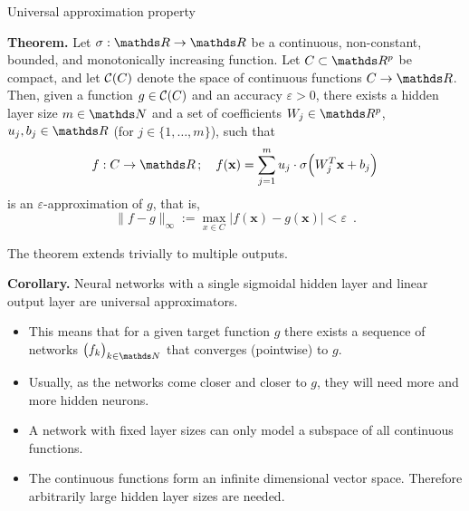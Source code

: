 \begin{vbframe}{Universal approximation property}

  \textbf{Theorem.}
  Let $\sigma : \R \to \R$ be a continuous, non-constant, bounded, and
  monotonically increasing function. Let $C \subset \R^p$ be compact,
  and let $\mathcal{C}(C)$ denote the space of continuous functions $C \to \R$.
  Then, given a function $g \in \mathcal{C}(C)$ and an accuracy $\varepsilon > 0$,
  there exists a hidden layer size $m \in \N$ and a set of coefficients
  $W_j \in \R^p$, $u_j, b_j \in \R$
  (for $j \in \{1, \dots, m\}$), such that
  $$
    f : C \to \R \,;\quad f(\mathbf{x}) = \sum_{j=1}^m u_j \cdot \sigma \Big( W_j^T \mathbf{x} + b_j \Big)
  $$
  is an $\varepsilon$-approximation of $g$, that is,
  $$
    \|f - g\|_{\infty} := \max_{x \in C} |f(\mathbf{x}) - g(\mathbf{x})| < \varepsilon
    \enspace.
  $$

  The theorem extends trivially to multiple outputs.

  \framebreak

  \textbf{Corollary.}
  Neural networks with a single sigmoidal hidden layer and linear
  output layer are universal approximators.

  \begin{itemize}
    \item This means that for a given target function $g$ there exists a
    sequence of networks $\big( f_k \big)_{k \in \N}$ that converges
    (pointwise) to $g$.%
    \vspace{2mm}
    \item Usually, as the networks come closer and closer to $g$, they
    will need more and more hidden neurons.
    \vspace{2mm}
    \item A network with fixed layer sizes can only model a subspace of all
    continuous functions. %
    \vspace{2mm}
    \item The continuous functions form an infinite dimensional vector space.
    Therefore arbitrarily large hidden layer sizes are needed.
  \end{itemize}

  \framebreak


\end{vbframe}
